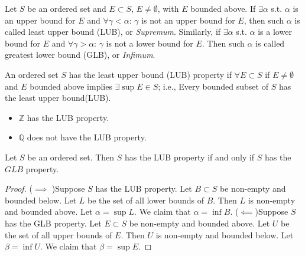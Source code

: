 \begin{definition}
	Let $S$ be an ordered set and $E \subset S$, $E\neq \emptyset$, with $E$ bounded above. If $\exists \alpha$ s.t. $\alpha$ is an upper bound for $E$ and $\forall \gamma<\alpha$: $\gamma$ is not an upper bound for $E$, then such $\alpha$ is called least upper bound (LUB), or \textit{Supremum}.
	Similarly, if $\exists \alpha$ s.t. $\alpha$ is a lower bound for $E$ and $\forall \gamma>\alpha$: $\gamma$ is not a lower bound for $E$. Then such $\alpha$ is called greatest lower bound (GLB), or \textit{Infimum}.
\end{definition}


\begin{definition}
	An ordered set $S$ has the least upper bound (LUB) property if $\forall E \subset S$ if $E\neq \emptyset$ and $E$ bounded above implies $\exists\sup E \in S$; i.e., Every bounded subset of $S$ has the least upper bound(LUB).
	\begin{example}
		\hfill
		\begin{itemize}
			\item $\mathbb{Z}$ has the LUB property.
			\item $\mathbb{Q}$ does not have the LUB property.
		\end{itemize}
	\end{example}
\end{definition}

\begin{theorem}
	Let $S$ be an ordered set. Then $S$ has the LUB property if and only if $S$ has the $GLB$ property.
	\par
	\hfill
	\begin{proof}
		($\implies$ )Suppose $S$ has the LUB property. Let $B \subset S$ be non-empty and bounded below. Let $L$ be the set of all lower bounds of $B$. Then $L$ is non-empty and bounded above. Let $\alpha = \sup L$. We claim that $\alpha = \inf B$.
		($\impliedby$)Suppose $S$ has the GLB property. Let $E \subset S$ be non-empty and bounded above. Let $U$ be the set of all upper bounds of $E$. Then $U$ is non-empty and bounded below. Let $\beta = \inf U$. We claim that $\beta = \sup E$.
	\end{proof}
\end{theorem}

